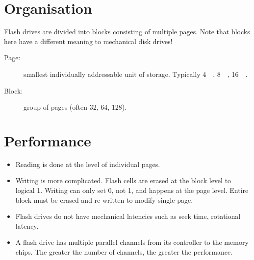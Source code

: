 
\section{Organisation}

Flash drives are divided into blocks consisting of multiple pages.
Note that blocks here have a different meaning to mechanical disk drives!


\begin{description}
\item[Page:] smallest individually addressable unit of storage. Typically \SI{4}{\kilo\byte}, \SI{8}{\kilo\byte}, \SI{16}{\kilo\byte}.
\item[Block:] group of pages (often 32, 64, 128).
\end{description}

\section{Performance}

\begin{itemize}
\item Reading is done at the level of individual pages.
\item Writing is more complicated.  Flash cells are erased at the block level to logical 1.  Writing can only set 0, not 1, and happens at the page level. Entire block must be erased and re-written to modify single page.
\item Flash drives do not have mechanical latencies such as seek time, rotational latency.
\item A flash drive has multiple parallel channels from its controller to the memory chips.  The greater the number of channels, the greater the performance.
\end{itemize}



